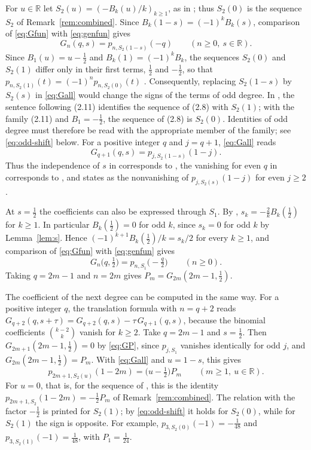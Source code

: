 \documentclass[11pt]{amsart}
\theoremstyle{definition}
\theoremstyle{remark}
\numberwithin{equation}{section}
\begin{document}
For $u\in\mathbb{R}$ let $S_2(u)=(-B_k(u)/k)_{k\ge1}$, as in \cite[(2.11)]{RS}; thus $S_2(0)$ is the sequence $S_2$ of Remark~\ref{rem:combined}. Since $B_k(1-s)=(-1)^kB_k(s)$, comparison of \eqref{eq:Gfun} with \eqref{eq:genfun} gives
\begin{equation}\label{eq:Gall}
  G_n(q,s)=p_{n,S_2(1-s)}(-q)\qquad(n\ge0,\ s\in\mathbb{R}).
\end{equation}
Since $B_1(u)=u-\frac12$ and $B_k(1)=(-1)^kB_k$, the sequences $S_2(0)$ and $S_2(1)$ differ only in their first terms, $\frac12$ and $-\frac12$, so that $p_{n,S_2(1)}(t)=(-1)^np_{n,S_2(0)}(t)$ \cite[Proposition~2.3]{RS}. Consequently, replacing $S_2(1-s)$ by $S_2(s)$ in \eqref{eq:Gall} would change the signs of the terms of odd degree. In \cite{RS}, the sentence following (2.11) identifies the sequence of (2.8) with $S_2(1)$; with the family (2.11) and $B_1=-\frac12$, the sequence of (2.8) is $S_2(0)$. Identities of odd degree must therefore be read with the appropriate member of the family; see \eqref{eq:odd-shift} below. For a positive integer $q$ and $j=q+1$, \eqref{eq:Gall} reads
\[
  G_{q+1}(q,s)=p_{j,S_2(1-s)}(1-j).
\]
Thus the independence of $s$ in \cite[Theorem~3.1]{E} corresponds to \cite[Proposition~2.4]{RS}, the vanishing for even $q$ in \cite[Theorem~3.2]{E} corresponds to \cite[Corollary~2.5]{RS}, and \cite[Remark~2.7]{RS} states \cite[Open Problem~1.3]{RS} as the nonvanishing of $p_{j,S_2(s)}(1-j)$ for even $j\ge2$.

At $s=\frac12$ the coefficients can also be expressed through $S_1$. By \cite[(1.8)]{RS}, $s_k=-\frac2kB_k(\frac12)$ for $k\ge1$. In particular $B_k(\frac12)=0$ for odd $k$, since $s_k=0$ for odd $k$ by Lemma~\ref{lem:s}. Hence $(-1)^{k+1}B_k(\frac12)/k=s_k/2$ for every $k\ge1$, and comparison of \eqref{eq:Gfun} with \eqref{eq:genfun} gives
\begin{equation}\label{eq:GP}
  G_n\bigl(q,\tfrac12\bigr)=p_{n,S_1}\bigl(-\tfrac q2\bigr)\qquad(n\ge0).
\end{equation}
Taking $q=2m-1$ and $n=2m$ gives $P_m=G_{2m}(2m-1,\frac12)$.

The coefficient of the next degree can be computed in the same way. For a positive integer $q$, the translation formula \cite[(3.1)]{E} with \mbox{$n=q+2$} reads $G_{q+2}(q,s+\tau)=G_{q+2}(q,s)-\tau\,G_{q+1}(q,s)$, because the binomial coefficients $\binom{k-2}{k}$ vanish for $k\ge2$. Take $q=2m-1$ and $s=\frac12$. Then \mbox{$G_{2m+1}(2m-1,\frac12)=0$} by \eqref{eq:GP}, since $p_{j,S_1}$ vanishes identically for odd $j$, and \mbox{$G_{2m}(2m-1,\frac12)=P_m$}. With \eqref{eq:Gall} and $u=1-s$, this gives
\begin{equation}\label{eq:odd-shift}
  p_{2m+1,S_2(u)}(1-2m)=\bigl(u-\tfrac12\bigr)P_m\qquad(m\ge1,\ u\in\mathbb{R}).
\end{equation}
For $u=0$, that is, for the sequence of \cite[(2.8)]{RS}, this is the identity $p_{2m+1,S_2}(1-2m)=-\frac12P_m$ of Remark~\ref{rem:combined}. The relation \cite[(2.17)]{RS} with the factor $-\frac12$ is printed for $S_2(1)$; by \eqref{eq:odd-shift} it holds for $S_2(0)$, while for $S_2(1)$ the sign is opposite. For example, $p_{3,S_2(0)}(-1)=-\frac1{48}$ and $p_{3,S_2(1)}(-1)=\frac1{48}$, with $P_1=\frac1{24}$.
\end{document}
